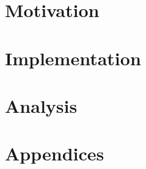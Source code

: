 \documentclass[ twoside,openright,titlepage,numbers=noenddot,headinclude,%
                a4paper,
                footinclude=true,cleardoublepage=empty,abstractoff, %
                BCOR=5mm,paper=a4,fontsize=11pt,%
                british,%
                ]{scrreprt}
\begin{document}
\frenchspacing
\raggedbottom
{} %
\renewcommand*{\bibname}{References}
\pagestyle{plain}

\small
%


%

%
%

\onehalfspacing

\singlespacing
%


\pagestyle{scrheadings}



\singlespacing
\normalsize

\cleardoublepage
\onehalfspacing
\setcounter{chapter}{-1}


\cleardoublepage {} \part{Motivation}
\cleardoublepage 

\cleardoublepage \part{Implementation}
\cleardoublepage 
\cleardoublepage 
\cleardoublepage 

\cleardoublepage \part{Analysis}
\cleardoublepage 
\cleardoublepage 

\cleardoublepage
\onehalfspacing


\appendix
\cleardoublepage
\part{Appendices}
\singlespacing

\printglossaries
\newpage

%
\end{document}
